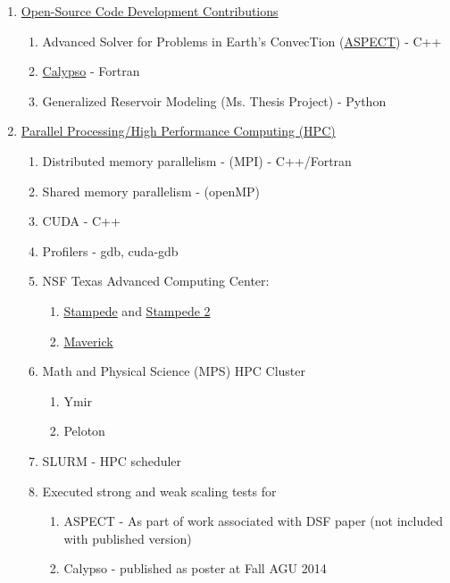 \documentclass[11pt]{ltxdoc}
\begin{document}
\begin{enumerate}
  \item \underline{Open-Source Code Development Contributions}
    \begin{enumerate}
      \item Advanced Solver for Problems in Earth's ConvecTion (\href{https://aspect.geodynamics.org/}{ASPECT}) - C++
      \item \href{https://geodynamics.org/cig/software/calypso/}{Calypso} - Fortran
      \item Generalized Reservoir Modeling (Ms. Thesis Project) - Python
    \end{enumerate}
  \item \underline{Parallel Processing/High Performance Computing (HPC)}
    \begin{enumerate}
      \item Distributed memory parallelism - (MPI) - C++/Fortran
      \item Shared memory parallelism - (openMP)
      \item CUDA - C++
      \item Profilers - gdb, cuda-gdb
      \item NSF Texas Advanced Computing Center:
      \begin{enumerate}
        \item \href{https://portal.xsede.org/tacc-stampede}{Stampede} and \href{https://portal.xsede.org/tacc-stampede2}{Stampede 2}
        \item \href{https://portal.xsede.org/tacc-maverick}{Maverick} 
      \end{enumerate}
      \item Math and Physical Science (MPS) HPC Cluster
      \begin{enumerate}
        \item Ymir
        \item Peloton
      \end{enumerate}
      \item SLURM - HPC scheduler
      \item Executed strong and weak scaling tests for
      \begin{enumerate}
              \item ASPECT - As part of work associated with DSF paper (not included with published version)
        \item Calypso - published as poster at Fall AGU 2014
      \end{enumerate}
    \end{enumerate}

\end{enumerate}
\end{document}
